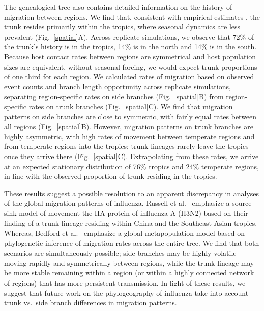 The genealogical tree also contains detailed information on the history of migration between regions.  We find that, consistent with empirical estimates \cite{Russell08,Bedford10}, the trunk resides primarily within the tropics, where seasonal dynamics are less prevalent (Fig.~\ref{spatial}A).  Across replicate simulations, we observe that 72\% of the trunk's history is in the tropics, 14\% is in the north and 14\% is in the south.  Because host contact rates between regions are symmetrical and host population sizes are equivalent, without seasonal forcing, we would expect trunk proportions of one third for each region.  We calculated rates of migration based on observed event counts and branch length opportunity across replicate simulations, separating region-specific rates on side branches (Fig.~\ref{spatial}B) from region-specific rates on trunk branches (Fig.~\ref{spatial}C).  We find that migration patterns on side branches are close to symmetric, with fairly equal rates between all regions (Fig.~\ref{spatial}B).  However, migration patterns on trunk branches are highly asymmetric, with high rates of movement between temperate regions and from temperate regions into the tropics; trunk lineages rarely leave the tropics once they arrive there (Fig.~\ref{spatial}C).  Extrapolating from these rates, we arrive at an expected stationary distribution of 76\% tropics and 24\% temperate regions, in line with the observed proportion of trunk residing in the tropics.

These results suggest a possible resolution to an apparent discrepancy in analyses of the global migration patterns of influenza.  Russell et al.\ \cite{Russell08} emphasize a source-sink model of movement the HA protein of influenza A (H3N2) based on their finding of a trunk lineage residing within China and the Southeast Asian tropics.  Whereas, Bedford et al.\ \cite{Bedford10} emphasize a global metapopulation model based on phylogenetic inference of migration rates across the entire tree.  We find that both scenarios are simultaneously possible; side branches may be highly volatile moving rapidly and symmetrically between regions, while the trunk lineage may be more stable remaining within a region (or within a highly connected network of regions) that has more persistent transmission.  In light of these results, we suggest that future work on the phylogeography of influenza take into account trunk vs.\ side branch differences in migration patterns.

